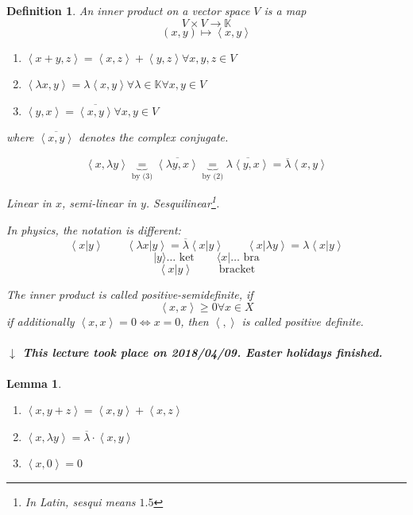 \documentclass{article}
\newcounter{lecref}[section]
\numberwithin{lecref}{section}
\newtheorem{definition}[lecref]{Definition}
\newtheorem{lemma}[lecref]{Lemma}
\newcommand{\angel}[1]{\left\langle#1\right\rangle}
\newcommand{\dateref}[1]{%
  \begin{mdframed}[backgroundcolor=gray!10,innerbottommargin=0pt,innertopmargin=0pt]
    \paragraph{\textit{$\downarrow$ This lecture took place on #1.}}%
  \end{mdframed}%
}
\begin{document}
\begin{definition} %
  An inner product on a vector space $V$ is a map
  \[ V \times V \to \mathbb K \]
  \[ (x,y) \mapsto \angel{x,y} \]
  \begin{enumerate}
    \item $\angel{x+y, z} = \angel{x,z} + \angel{y,z} \forall x,y,z \in V$
    \item $\angel{\lambda x, y} = \lambda \angel{x,y} \forall \lambda \in \mathbb K \forall x,y \in V$
    \item $\angel{y,x} = \overline{\angel{x,y}} \forall x,y \in V$
  \end{enumerate}
  where $\overline{\angel{x,y}}$ denotes the complex conjugate.

  \[
    \angel{x, \lambda y} \underbrace{=}_{\text{by (3)}} \overline{\angel{\lambda y, x}}
      \underbrace{=}_{\text{by (2)}} \overline{\lambda \angel{y, x}}
      = \overline{\lambda} \angel{x,y}
  \]

  Linear in $x$, semi-linear in $y$. Sesquilinear\footnote{In Latin, sesqui means $1.5$}.

  In physics, the notation is different:
  \[ \angel{x|y} \qquad \angel{\lambda x|y} = \overline{\lambda} \angel{x|y} \qquad \angel{x|\lambda y} = \lambda \angel{x|y} \]
  \[ |y\rangle \dots \text{ ket} \qquad \langle x| \dots \text{ bra} \]
  \[ \angel{x|y} \qquad \text{ bracket} \]

  The inner product is called positive-semidefinite, if
  \[ \angel{x,x} \geq 0 \forall x \in X \]
  if additionally $\angel{x,x} = 0 \iff x = 0$, then $\angel{,}$ is called positive definite.
\end{definition}

\dateref{2018/04/09. Easter holidays finished}

\begin{lemma} %
  \begin{enumerate}
    \item $\angel{x, y + z} = \angel{x, y} + \angel{x, z}$
    \item $\angel{x, \lambda y} = \overline{\lambda} \cdot \angel{x, y}$
    \item $\angel{x, 0} = 0$
  \end{enumerate}
\end{lemma}
\end{document}
